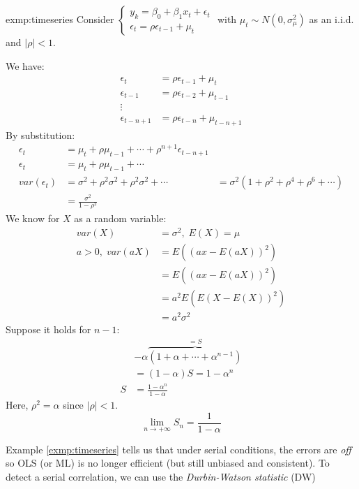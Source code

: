 		\begin{exmp}{exmp:timeseries}
			Consider $\begin{cases}
				y_k=\beta_0+\beta_1 x_t +\epsilon_t\\
				\epsilon_t=\rho \epsilon_{t-1} + \mu_t
			\end{cases}$
			with $\mu_t \sim N(0,\sigma^2_\mu)$ as an i.i.d. and $|\rho|<1$.
			
			We have:
			\begin{align*}
				\epsilon_t&=\rho \epsilon_{t-1} + \mu_t\\
				\epsilon_{t-1}&=\rho \epsilon_{t-2} + \mu_{t-1}\\
				\vdots\\
				\epsilon_{t-n+1}&=\rho \epsilon_{t-n} + \mu_{t-n+1}					
			\end{align*}
			By substitution:
			\begin{align*}
				\epsilon_t&=\mu_t + \rho \mu_{t-1} + \cdots + \rho^{n+1}\epsilon_{t-n+1}\\
				\epsilon_t&=\mu_t + \rho \mu_{t-1}+\cdots\\
				var(\epsilon_t)&=\sigma^2+\rho^2 \sigma^2 + \rho^2 \sigma^2 + \cdots 
				&= \sigma^2 (1+\rho^2 + \rho^4 + \rho^6 + \cdots)\\
				&=\frac{\sigma^2}{1-\rho^2}
			\end{align*}
			We know for $X$ as a random variable:
			\begin{align*}
				var(X)&=\sigma^2,\;E(X)=\mu\\
				a>0,\;var(aX)&=E\left((ax-E(aX))^2\right)\\
				&=E\left((ax-E(aX))^2\right)\\
				&=a^2 E\left(E(X-E(X))^2\right)\\
				&=a^2\sigma^2
			\end{align*}
			Suppose it holds for $n-1$:
			\begin{align*}
				&-\alpha\overbrace{(1+\alpha+\cdots+\alpha^{n-1})}^{=S}\\
				&=(1-\alpha)S=1-\alpha^n\\
				S&=\frac{1-\alpha^n}{1-\alpha}
			\end{align*}
			Here, $\rho^2=\alpha$ since $|\rho |<1$.
			\begin{equation*}
				\lim\limits_{n\rightarrow + \infty} S_n=\frac{1}{1-\alpha}
			\end{equation*}
		\end{exmp}				
		Example \ref{exmp:timeseries} tells us that under serial conditions, the errors are \textit{off} so OLS (or ML) is no longer efficient (but still unbiased and consistent). To detect a serial correlation, we can use the \emph{Durbin-Watson statistic} (DW)

